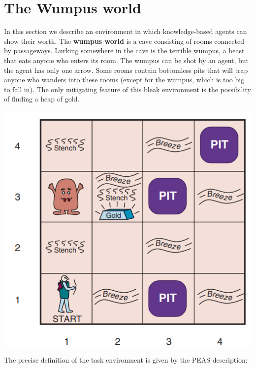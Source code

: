 \section{The Wumpus world}
In this section we describe an environment in which knowledge-based agents can show their worth. The \textbf{wumpus world} is a cave consisting of rooms connected by passageways. Lurking somewhere in the cave is the terrible wumpus, a beast that eats anyone who enters its room. The wumpus can be shot by an agent, but the agent has only one arrow. Some rooms contain bottomless pits that will trap anyone who wanders into these rooms (except for the wumpus, which is too big to fall in). The only mitigating feature of this bleak environment is the possibility of finding a heap of gold.
\begin{center}
    \includegraphics[]{images/wumpus.png}
\end{center}
The precise definition of the task environment is given by the PEAS description:
